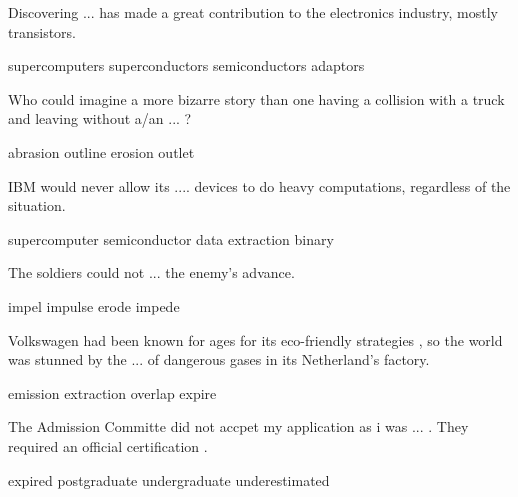 \documentclass{exam}
\begin{document}
\begin{questions}
\question Discovering ... has made a great contribution to the electronics industry, mostly transistors.\\
\begin{oneparchoices} 
\choice supercomputers
\choice superconductors
\correctchoice semiconductors
\choice adaptors
\end{oneparchoices}

\question Who could imagine a more bizarre story than one having a collision with a truck and leaving without a/an ... ?\\
\begin{oneparchoices} 
\correctchoice abrasion
\choice outline
\choice erosion
\choice outlet 
\end{oneparchoices}

\question IBM would never allow its  .... devices to do heavy computations, regardless of the situation.\\
\begin{oneparchoices} 
\correctchoice supercomputer
\choice semiconductor 
\choice data extraction
\choice binary 
\end{oneparchoices}


\question The soldiers could not ... the enemy's advance.\\
\begin{oneparchoices}
 \choice impel
 \choice impulse
 \choice erode 
 \correctchoice impede
\end{oneparchoices}

\question  Volkswagen had been known for ages for its eco-friendly strategies , so the world was stunned by the ... of dangerous gases in its Netherland's factory.\\
\begin{oneparchoices}
\correctchoice emission
\choice extraction
\choice overlap
\choice expire
\end{oneparchoices}



\question The Admission Committe did not accpet my application as i was ... . They required an official certification . \\
\begin{oneparchoices}
\choice expired
\choice postgraduate
\correctchoice undergraduate
\choice underestimated
\end{oneparchoices}



\end{questions}
\end{document}
